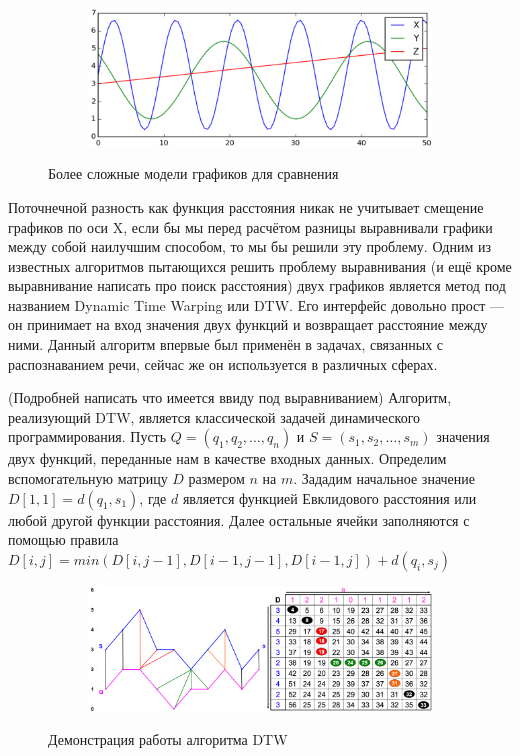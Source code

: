 \begin{figure}[ht]
	\centering
    \begin{subfigure}[b]{1\textwidth}
    \centering
        \includegraphics[scale=0.45]{pasted-image-39.png}        
    \end{subfigure}
 
    \caption{Более сложные модели графиков для сравнения}
    \label{fig_parsetree}
\end{figure}

Поточнечной разность как функция расстояния никак не учитывает смещение графиков по оси X, если бы мы перед расчётом разницы выравнивали графики между собой наилучшим способом, то мы бы решили эту проблему. Одним из известных алгоритмов пытающихся решить проблему выравнивания (и ещё кроме выравнивание написать про поиск расстояния) двух графиков является метод под названием Dynamic Time Warping или DTW. Его интерфейс довольно прост — он принимает на вход значения двух функций и возвращает расстояние между ними. Данный алгоритм впервые был применён в задачах, связанных с распознаванием речи, сейчас же он используется в различных сферах.

(Подробней написать что имеется ввиду под выравниванием) Алгоритм, реализующий DTW, является классической задачей динамического программирования. Пусть  $Q = \left( q_1, q_2, \dots, q_n \right)$ и $S = \left( s_1, s_2, \dots, s_m \right)$ значения двух функций, переданные нам в качестве входных данных. Определим вспомогательную матрицу $D$ размером $n$ на $m$. Зададим начальное значение $D[1, 1] = d(q_1, s_1)$, где $d$ является функцией Евклидового расстояния или любой другой функции расстояния. Далее остальные ячейки заполняются с помощью правила $D[i, j] = min(D[i, j - 1], D[i - 1, j - 1], D[i - 1, j]) + d(q_i, s_j)$

\begin{figure}[ht]
	\centering
    \begin{subfigure}[b]{1\textwidth}
    \centering
        \includegraphics[scale=0.40]{pasted-image-41.png}        
    \end{subfigure}
 
    \caption{Демонстрация работы алгоритма DTW}
    \label{fig_parsetree}
\end{figure}

